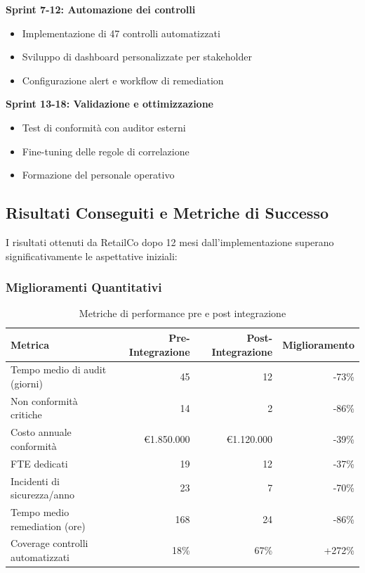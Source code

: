 \textbf{Sprint 7-12: Automazione dei controlli}
\begin{itemize}
    \item Implementazione di 47 controlli automatizzati
    \item Sviluppo di dashboard personalizzate per stakeholder
    \item Configurazione alert e workflow di remediation
\end{itemize}

\textbf{Sprint 13-18: Validazione e ottimizzazione}
\begin{itemize}
    \item Test di conformità con auditor esterni
    \item Fine-tuning delle regole di correlazione
    \item Formazione del personale operativo
\end{itemize}

\subsection{\texorpdfstring{Risultati Conseguiti e Metriche di Successo}{4.7.3 - Risultati Conseguiti e Metriche di Successo}}
\label{subsec:4.7.3_risultati}

I risultati ottenuti da RetailCo dopo 12 mesi dall'implementazione superano significativamente le aspettative iniziali:

\subsubsection{\texorpdfstring{Miglioramenti Quantitativi}{4.7.3.1 - Miglioramenti Quantitativi}}

\begin{table}[htbp]
\centering
\caption{Metriche di performance pre e post integrazione}
\label{tab:metriche_retailco}
\small
\sffamily
\begin{tabularx}{\textwidth}{X r r r}
\toprule
\textbf{Metrica} & \textbf{Pre-Integrazione} & \textbf{Post-Integrazione} & \textbf{Miglioramento} \\
\midrule
Tempo medio di audit (giorni) & 45 & 12 & -73\% \\
Non conformità critiche & 14 & 2 & -86\% \\
Costo annuale conformità & €1.850.000 & €1.120.000 & -39\% \\
FTE dedicati & 19 & 12 & -37\% \\
Incidenti di sicurezza/anno & 23 & 7 & -70\% \\
Tempo medio remediation (ore) & 168 & 24 & -86\% \\
Coverage controlli automatizzati & 18\% & 67\% & +272\% \\
\bottomrule
\end{tabularx}
\end{table}

